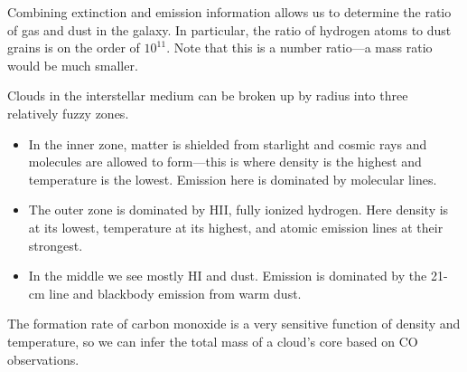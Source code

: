 \documentclass[../a062main.tex]{subfiles}
\begin{document}
Combining extinction and emission information allows us to determine the ratio of gas and dust in the galaxy.
In particular, the ratio of hydrogen atoms to dust grains is on the order of $10^{11}$.
Note that this is a number ratio---a mass ratio would be much smaller.

Clouds in the interstellar medium can be broken up by radius into three relatively fuzzy zones.
\begin{itemize}
    \item In the inner zone, matter is shielded from starlight and cosmic rays and molecules are allowed to form---this is where density is the highest and temperature is the lowest.
    Emission here is dominated by molecular lines.

    \item The outer zone is dominated by HII, fully ionized hydrogen.
    Here density is at its lowest, temperature at its highest, and atomic emission lines at their strongest.

    \item In the middle we see mostly HI and dust.
    Emission is dominated by the 21-cm line and blackbody emission from warm dust.
\end{itemize}

The formation rate of carbon monoxide is a very sensitive function of density and temperature, so we can infer the total mass of a cloud's core based on CO observations.
\end{document}

